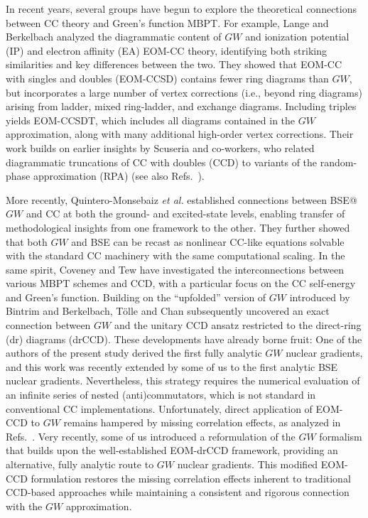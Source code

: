 \documentclass[aip,jcp,reprint,noshowkeys,superscriptaddress]{revtex4-2}
\begin{document}
In recent years, several groups have begun to explore the theoretical connections between CC theory and Green's function MBPT. 
For example, Lange and Berkelbach analyzed the diagrammatic content of $GW$ and ionization potential (IP) and electron aﬃnity
(EA) EOM-CC theory, \cite{Stanton_1993a,Watts_1994,Musial_2003a,Musial_2003b,Kamiya_2006,Gour_2006} identifying both striking similarities and key differences between the two. \cite{Lange_2018} 
They showed that EOM-CC with singles and doubles (EOM-CCSD) \cite{Purvis_1982,Scuseria_1987,Koch_1990a,Koch_1990c,Stanton_1993a,Stanton_1993b} contains fewer ring diagrams than $GW$, but incorporates a large number of vertex corrections (i.e., beyond ring diagrams) arising from ladder, mixed ring-ladder, and exchange diagrams. 
Including triples yields EOM-CCSDT, \cite{Noga_1987,Scuseria_1988,Watts_1994,Kowalski_2001,Kowalski_2001a,Kucharski_2001}  which includes all diagrams contained in the $GW$ approximation, along with many additional high-order vertex corrections.
Their work builds on earlier insights by Scuseria and co-workers, \cite{Scuseria_2008,Scuseria_2013} who related diagrammatic truncations of CC with doubles (CCD) to variants of the random-phase approximation (RPA) (see also Refs.~).

More recently, Quintero-Monsebaiz \textit{et al.} established connections between BSE@$GW$ and CC at both the ground- and excited-state levels, enabling transfer of methodological insights from one framework to the other. \cite{Quintero_2022} 
They further showed that both $GW$ and BSE can be recast as nonlinear CC-like equations solvable with the standard CC machinery with the same computational scaling. 
In the same spirit, Coveney and Tew have investigated the interconnections between various MBPT schemes and CCD, with a particular focus on the CC self-energy and Green's function.\cite{Coveney_2025a,Coveney_2025b,Coveney_2025c}
Building on the ``upfolded'' version of $GW$ introduced by Bintrim and Berkelbach, \cite{Bintrim_2021} T\"olle and Chan subsequently uncovered an exact connection between $GW$ and the unitary CCD ansatz restricted to the direct-ring (dr) diagrams (drCCD). \cite{Tolle_2022} 
These developments have already borne fruit: One of the authors of the present study derived the first fully analytic $GW$ nuclear gradients, \cite{Tolle_2025} and this work was recently extended by some of us to the first analytic BSE nuclear gradients. \cite{Tolle_2025b} 
Nevertheless, this strategy requires the numerical evaluation of an infinite series of nested (anti)commutators, which is not standard in conventional CC implementations. 
Unfortunately, direct application of EOM-CCD to $GW$ remains hampered by missing correlation effects, as analyzed in Refs.~.
Very recently, some of us introduced a reformulation of the $GW$ formalism that builds upon the well-established EOM-drCCD framework, \cite{Kitsaras_2026} providing an alternative, fully analytic route to $GW$ nuclear gradients. 
This modified EOM-CCD formulation restores the missing correlation effects inherent to traditional CCD-based approaches while maintaining a consistent and rigorous connection with the $GW$ approximation.
\end{document}
